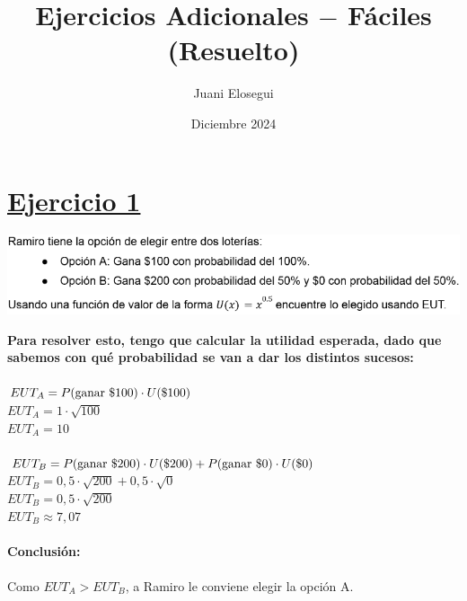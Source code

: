 \documentclass{article}
\title{Ejercicios Adicionales $-$ Fáciles (Resuelto)}
\author{Juani Elosegui}
\date{Diciembre 2024}
\begin{document}
    
    \maketitle

    \section*{\underline{Ejercicio 1}}
        \begin{center}
            \includegraphics[width=0.8 \linewidth]{figs/adicionales-faciles-uno.png}
        \end{center}
        \textbf{Para resolver esto, tengo que calcular la utilidad esperada, dado que sabemos con qué probabilidad se van a dar los distintos sucesos:}
        \\
        \\
        \(EUT_{A} = P($ganar $ \mathdollar 100) \cdot U(\mathdollar 100)\)
        \\
        \(EUT_{A} = 1 \cdot \sqrt{100}\)
        \\
        \(EUT_{A} = 10\)
        \\
        \\
        \(EUT_{B} = P($ganar $ \mathdollar 200) \cdot U(\mathdollar 200) + P($ganar $ \mathdollar 0) \cdot U(\mathdollar 0)\)
        \\
        \(EUT_{B} = 0,5 \cdot \sqrt{200} + 0,5 \cdot \sqrt{0}\)
        \\
        \(EUT_{B} = 0,5 \cdot \sqrt{200}\)
        \\
        \(EUT_{B} \approx 7,07\)
        \\
        \\
        \textbf{Conclusión:}
        \\
        \\
        Como $EUT_{A} > EUT_{B}$, a Ramiro le conviene elegir la opción A.
    
\end{document}

